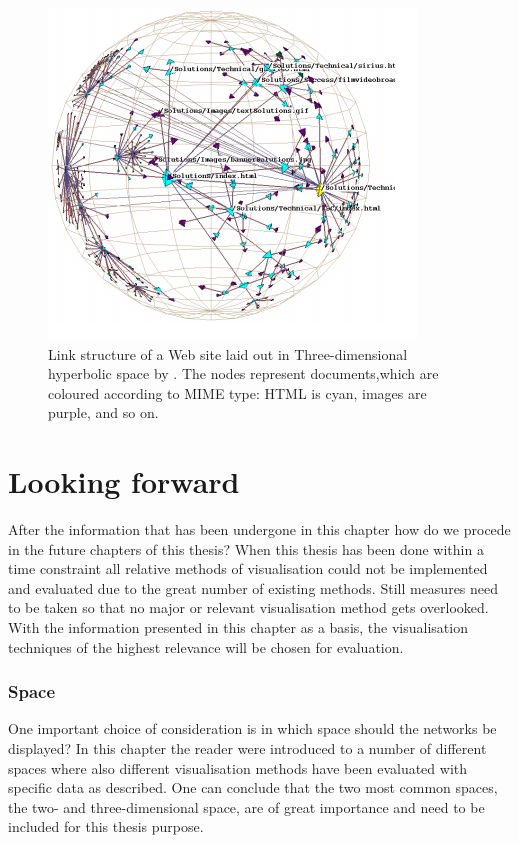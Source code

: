 \documentclass[a4paper,11pt]{kth-mag}
\begin{document}
 \begin{figure}[!htbp]
	\centering
	\includegraphics[scale=0.5]{HyperBolicEx1}
	\caption{Link structure of a Web site laid out in Three-dimensional hyperbolic space by \cite{636718}. The nodes represent documents,which are coloured
according to MIME type: HTML is cyan, images are purple, and so on.}
	\label{fig:hyperbolic_example}
\end{figure}

\newpage
\section{Looking forward}
After the information that has been undergone in this chapter how do we procede in the future chapters of this thesis? 
When this thesis has been done within a time constraint all relative methods of visualisation could not be implemented and evaluated due to the great number of existing methods. Still measures need to be
taken so that no major or relevant visualisation method gets overlooked. With the information presented in this chapter as a basis, the visualisation techniques of the highest relevance will be
 chosen for evaluation.
\subsubsection{Space}
One important choice of consideration is in which space should the networks be displayed? In this chapter the reader were introduced to a number of different spaces where also different
 visualisation methods have been evaluated with specific data as described. One can conclude that the two most common spaces, the two- and three-dimensional space, are of great importance and need
 to be included for this thesis purpose.
\end{document}
